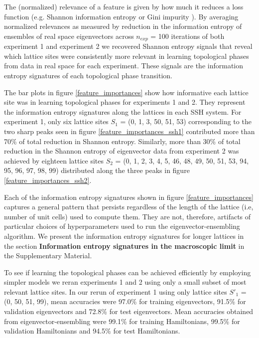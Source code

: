 \documentclass[fleqn,10pt]{wlscirep}
\begin{document}
The (normalized) relevance of a feature is given by how much it reduces a loss function (e.g. Shannon information entropy or Gini impurity \cite{friedman2001elements}). By averaging normalized relevances as measured by reduction in the information entropy of ensembles of real space eigenvectors across $n_{exp}$ = 100 iterations of both experiment 1 and experiment 2 we recovered Shannon entropy signals that reveal which lattice sites were consistently more relevant in learning topological phases from data in real space for each experiment. These signals are the information entropy signatures of each topological phase transition. 

The bar plots in figure \ref{feature_importances} show how informative each lattice site was in learning topological phases for experiments 1 and 2. They represent the information entropy signatures along the lattices in each SSH system. For experiment 1, only six lattice sites $S_1$ = (0, 1, 3, 50, 51, 53) corresponding to the two sharp peaks seen in figure \ref{feature_importances_ssh1} contributed more than 70\% of total reduction in Shannon entropy. Similarly, more than 30\% of total reduction in the Shannon entropy of eigenvector data from experiment 2 was achieved by eighteen lattice sites $S_2$ = (0, 1, 2, 3, 4, 5, 46, 48, 49, 50, 51, 53, 94, 95, 96, 97, 98, 99) distributed along the three peaks in figure \ref{feature_importances_ssh2}.

Each of the information entropy signatures shown in figure \ref{feature_importances} captures a general pattern that persists regardless of the length of the lattice (i.e, number of unit cells) used to compute them. They are not, therefore, artifacts of particular choices of hyperparameters used to run the eigenvector-ensembling algorithm. We present the information entropy signatures for longer lattices in the section \textbf{Information entropy signatures in the macroscopic limit} in the Supplementary Material.

To see if learning the topological phases can be achieved efficiently by employing simpler models we reran experiments 1 and 2 using only a small subset of most relevant lattice sites. In our rerun of experiment 1 using only lattice sites $S'_1$ = (0, 50, 51, 99), mean accuracies were 97.0\% for training eigenvectors, 91.5\% for validation eigenvectors and 72.8\% for test eigenvectors. Mean accuracies obtained from eigenvector-ensembling were 99.1\% for training Hamiltonians, 99.5\% for validation Hamiltonians and 94.5\% for test Hamiltonians.
\end{document}
